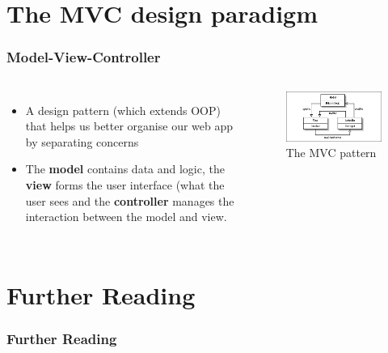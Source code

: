 \documentclass[10pt,t,xcolor=dvipsnames]{beamer}
\begin{document}
\section{The MVC design paradigm}
\begin{frame}[fragile]
\frametitle{Model-View-Controller}
\pause
\begin{columns}[l]
\begin{itemize}[<+->]
\item A design pattern (which extends OOP) that helps us better organise our web app by \alert{separating concerns}
\item The \textbf{model} contains \alert{data and logic}, the \textbf{view} forms the \alert{user interface} (what the user sees and the \textbf{controller} manages the \alert{interaction} between the model and view.
\end{itemize}
\vspace{-0.5cm}
\begin{figure}
\hspace*{-0.5cm}
\centering
\includegraphics[scale=0.4]{../images/mvc-02.jpg} 
\caption{The MVC pattern}
\end{figure}
\end{columns}
\end{frame}
\section{Further Reading}
\begin{frame}
\frametitle{Further Reading}
% 
% 
\end{frame}
\end{document}
